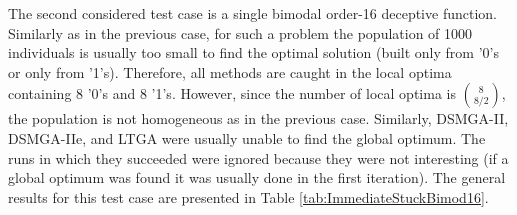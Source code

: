 The second considered test case is a single bimodal order-16 deceptive function. Similarly as in the previous case, for such a problem the population of 1000 individuals is usually too small to find the optimal solution (built only from '0's or only from '1's). Therefore, all methods are caught in the local optima containing 8 '0's and 8 '1's. However, since the number of local optima is \begin{math} {8}\choose{8 / 2} \end{math}, the population is not homogeneous as in the previous case. Similarly, DSMGA-II, DSMGA-IIe, and LTGA were usually unable to find the global optimum. The runs in which they succeeded were ignored because they were not interesting (if a global optimum was found it was usually done in the first iteration). The general results for this test case are presented in Table \ref{tab:ImmediateStuckBimod16}.



